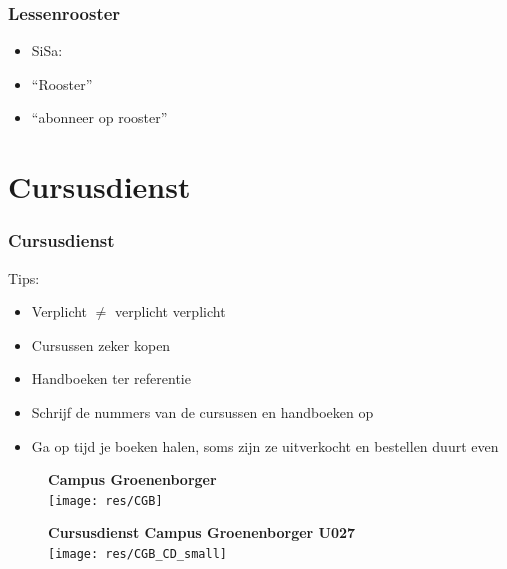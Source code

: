 \begin{frame}
	\frametitle{Lessenrooster}
	
	\begin{itemize}
		\item<1-> SiSa: 
		\item<1-> ``Rooster''
		\item<2-> ``abonneer op rooster''
	\end{itemize}
	
    
\end{frame}

\section{Cursusdienst}
\begin{frame}[allowframebreaks=10]
	\frametitle{Cursusdienst}
    \vspace{0.5cm}
    
    Tips:
    \begin{itemize}
        \item Verplicht $\neq$ verplicht verplicht
        \item Cursussen zeker kopen
        \item Handboeken ter referentie
        \item Schrijf de nummers van de cursussen en handboeken op
        \item Ga op tijd je boeken halen, soms zijn ze uitverkocht en bestellen duurt even
	\end{itemize}
    

    
    \framebreak
    \begin{figure}
       	\centering
        \vspace*{0.02cm}
        \textbf{Campus Groenenborger} \\
        \vspace{0.3cm}
       	\texttt{[image: res/CGB]}
    \end{figure}
    \framebreak
    \begin{figure}
       	\centering
        \vspace*{0.02cm}
        \textbf{Cursusdienst Campus Groenenborger U027} \\
        \vspace{0.3cm}
      	\texttt{[image: res/CGB\_CD\_small]}
    \end{figure}
\end{frame}

